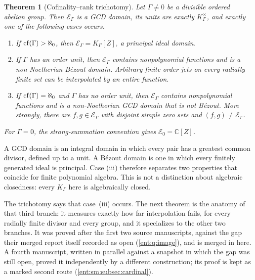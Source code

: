 \documentclass[11pt]{article}
\newtheorem{theorem}{Theorem}[section]
\theoremstyle{plain}
\theoremstyle{plain}
\theoremstyle{plain}
\theoremstyle{definition}
\theoremstyle{definition}
\theoremstyle{definition}
\theoremstyle{definition}
\theoremstyle{remark}
\newcommand{\C}{\mathbb C}\newcommand{\R}{\mathbb R}
\newcommand{\K}{K_\Gamma}\newcommand{\KD}{K_\Delta}
\newcommand{\E}{\mathcal E_\Gamma}
\begin{document}
\begin{theorem}[Cofinality--rank trichotomy]\label{ent:thm:main}
Let $\Gamma\ne0$ be a divisible ordered abelian group. Then $\E$ is a GCD
domain, its units are exactly $\K^\times$, and exactly one of the following
cases occurs.
\begin{enumerate}[label=\textnormal{(\roman*)},leftmargin=2em]
\item If $\operatorname{cf}(\Gamma)>\aleph_0$, then $\E=\K[Z]$, a principal ideal domain.
\item If $\Gamma$ has an order unit, then $\E$ contains nonpolynomial
functions and is a non-Noetherian B\'ezout domain. Arbitrary finite-order
jets on every radially finite set can be interpolated by an entire function.
\item If $\operatorname{cf}(\Gamma)=\aleph_0$ and $\Gamma$ has no order unit, then $\E$
contains nonpolynomial functions and is a non-Noetherian GCD domain that is
not B\'ezout. More strongly, there are $f,g\in\E$ with disjoint simple zero
sets and $(f,g)\ne\E$.
\end{enumerate}
For $\Gamma=0$, the strong-summation convention gives $\mathcal E_0=\C[Z]$.
\end{theorem}

A GCD domain is an integral domain in which every pair has a greatest common
divisor, defined up to a unit. A B\'ezout domain is one in which every
finitely generated ideal is principal. Case (iii) therefore separates two
properties that coincide for finite polynomial algebra. This is not a
distinction about algebraic closedness: every $\K$ here is algebraically
closed.

The trichotomy says that case~(iii) occurs. The next theorem is the anatomy
of that third branch: it measures exactly how far interpolation fails, for
every radially finite divisor and every group, and it specializes to the other
two branches. It was proved after the first two source manuscripts, against
the gap their merged report itself recorded as open
(\cref{ent:q:image}), and is merged in here. A fourth manuscript, written in
parallel against a snapshot in which the gap was still open, proved it
independently by a different construction; its proof is kept as a marked
second route (\cref{ent:sm:subsec:cardinal}).
\end{document}
